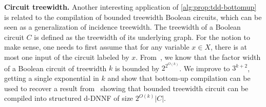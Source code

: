 \documentclass[a4paper,UKenglish,cleveref, autoref, thm-restate]{lipics-v2021}
\newcommand{\guy}[1]{\todo[color=purple]{\color{white}{{\bf Guy}: #1}}}
\begin{document}

\textbf{Circuit treewidth.}
%
Another interesting application of \cref{alg:prop:tdd-bottomup} is related to the compilation of bounded treewidth Boolean circuits, which can be seen as a generalization of incidence treewidth. The treewidth of a Boolean circuit $C$ is defined as the treewidth of its underlying graph. For the notion to make sense, one needs to first assume that for any variable $x \in X$, there is at most one input of the circuit labeled by $x$. From~\cite{BovaS17}, we know that the factor width of a Boolean circuit of treewidth $k$ is bounded by $2^{2^{O(k)}}$. We improve to $3^{k+2}$, getting a single exponential in $k$ and show that bottom-up compilation can be used to recover a result from~\cite{AmarilliCMS20} showing that bounded treewidth circuit can be compiled into structured d-DNNF of size $2^{O(k)}|C|$.%
\end{document}
